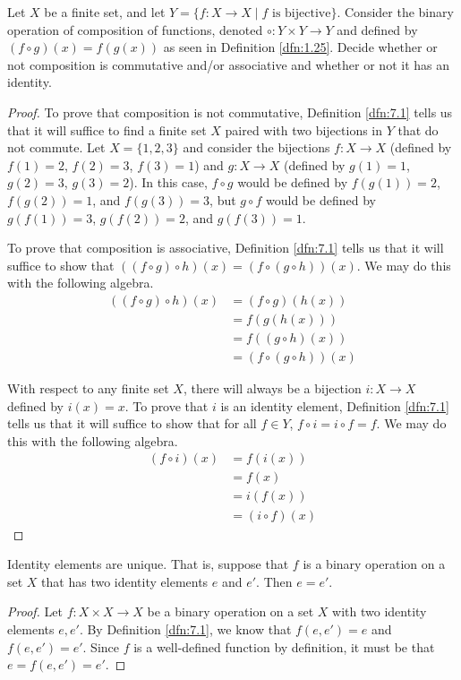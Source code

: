 \documentclass[../main.tex]{subfiles}
\begin{document}
\begin{exercise}\label{exr:7.6}
    Let $X$ be a finite set, and let $Y=\{f:X\to X\mid f\text{ is bijective}\}$. Consider the binary operation of composition of functions, denoted $\circ:Y\times Y\to Y$ and defined by $(f\circ g)(x)=f(g(x))$ as seen in Definition \ref{dfn:1.25}. Decide whether or not composition is commutative and/or associative and whether or not it has an identity.
    \begin{proof}
        To prove that composition is not commutative, Definition \ref{dfn:7.1} tells us that it will suffice to find a finite set $X$ paired with two bijections in $Y$ that do not commute. Let $X=\{1,2,3\}$ and consider the bijections $f:X\to X$ (defined by $f(1)=2$, $f(2)=3$, $f(3)=1$) and $g:X\to X$ (defined by $g(1)=1$, $g(2)=3$, $g(3)=2$). In this case, $f\circ g$ would be defined by $f(g(1))=2$, $f(g(2))=1$, and $f(g(3))=3$, but $g\circ f$ would be defined by $g(f(1))=3$, $g(f(2))=2$, and $g(f(3))=1$.\par
        To prove that composition is associative, Definition \ref{dfn:7.1} tells us that it will suffice to show that $((f\circ g)\circ h)(x)=(f\circ(g\circ h))(x)$. We may do this with the following algebra.
        \begin{align*}
            ((f\circ g)\circ h)(x) &= (f\circ g)(h(x))\\
            &= f(g(h(x)))\\
            &= f((g\circ h)(x))\\
            &= (f\circ(g\circ h))(x)
        \end{align*}\par
        With respect to any finite set $X$, there will always be a bijection $i:X\to X$ defined by $i(x)=x$. To prove that $i$ is an identity element, Definition \ref{dfn:7.1} tells us that it will suffice to show that for all $f\in Y$, $f\circ i=i\circ f=f$. We may do this with the following algebra.
        \begin{align*}
            (f\circ i)(x) &= f(i(x))\\
            &= f(x)\\
            &= i(f(x))\\
            &= (i\circ f)(x)
        \end{align*}
    \end{proof}
\end{exercise}
\pagebreak

\begin{theorem}\label{trm:7.7}
    Identity elements are unique. That is, suppose that $f$ is a binary operation on a set $X$ that has two identity elements $e$ and $e'$. Then $e=e'$.
    \begin{proof}
        Let $f:X\times X\to X$ be a binary operation on a set $X$ with two identity elements $e,e'$. By Definition \ref{dfn:7.1}, we know that $f(e,e')=e$ and $f(e,e')=e'$. Since $f$ is a well-defined function by definition, it must be that $e=f(e,e')=e'$.
    \end{proof}
\end{theorem}
\end{document}
